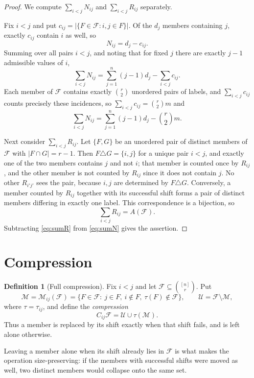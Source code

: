 \documentclass[11pt,reqno]{amsart}
\theoremstyle{plain}
\theoremstyle{definition}
\newtheorem{definition}[theorem]{Definition}
\newcommand{\F}{\mathcal{F}}
\newcommand{\Uu}{\mathcal{U}}
\newcommand{\M}{\mathcal{M}}
\begin{document}
\begin{proof}
We compute $\sum_{i<j}N_{ij}$ and $\sum_{i<j}R_{ij}$ separately.

Fix $i<j$ and put $c_{ij}=|\{F\in\F: i,j\in F\}|$. Of the $d_j$ members containing $j$, exactly
$c_{ij}$ contain $i$ as well, so
\[
N_{ij}=d_j-c_{ij}.
\]
Summing over all pairs $i<j$, and noting that for fixed $j$ there are exactly $j-1$ admissible
values of $i$,
\[
\sum_{i<j}N_{ij}=\sum_{j=1}^{n}(j-1)d_j-\sum_{i<j}c_{ij}.
\]
Each member of $\F$ contains exactly $\binom{r}{2}$ unordered pairs of labels, and $\sum_{i<j}c_{ij}$
counts precisely these incidences, so $\sum_{i<j}c_{ij}=\binom{r}{2}m$ and
\begin{equation}\label{eq:sumN}
\sum_{i<j}N_{ij}=\sum_{j=1}^{n}(j-1)d_j-\binom{r}{2}m.
\end{equation}

Next consider $\sum_{i<j}R_{ij}$. Let $\{F,G\}$ be an unordered pair of distinct members of $\F$
with $|F\cap G|=r-1$. Then $F\triangle G=\{i,j\}$ for a unique pair $i<j$, and exactly one of the two
members contains $j$ and not $i$; that member is counted once by $R_{ij}$, and the other member is
not counted by $R_{ij}$ since it does not contain $j$. No other $R_{i'j'}$ sees the pair, because
$i,j$ are determined by $F\triangle G$. Conversely, a member counted by $R_{ij}$ together with its
successful shift forms a pair of distinct members differing in exactly one label. This correspondence
is a bijection, so
\begin{equation}\label{eq:sumR}
\sum_{i<j}R_{ij}=A(\F).
\end{equation}
Subtracting \eqref{eq:sumR} from \eqref{eq:sumN} gives the assertion.
\end{proof}

\section{Compression}\label{sec:compression}

\begin{definition}[Full compression]\label{def:compression}
Fix $i<j$ and let $\F\subseteq\binom{[n]}{r}$. Put
\[
\M=\M_{ij}(\F)=\{F\in\F:\ j\in F,\ i\notin F,\ \tau(F)\notin\F\},\qquad
\Uu=\F\setminus\M,
\]
where $\tau=\tau_{ij}$, and define the \emph{compression}
\[
C_{ij}\F=\Uu\cup\tau(\M).
\]
Thus a member is replaced by its shift exactly when that shift fails, and is left alone otherwise.
\end{definition}

Leaving a member alone when its shift already lies in $\F$ is what makes the operation
size-preserving: if the members with successful shifts were moved as well, two distinct members
would collapse onto the same set.
\end{document}
